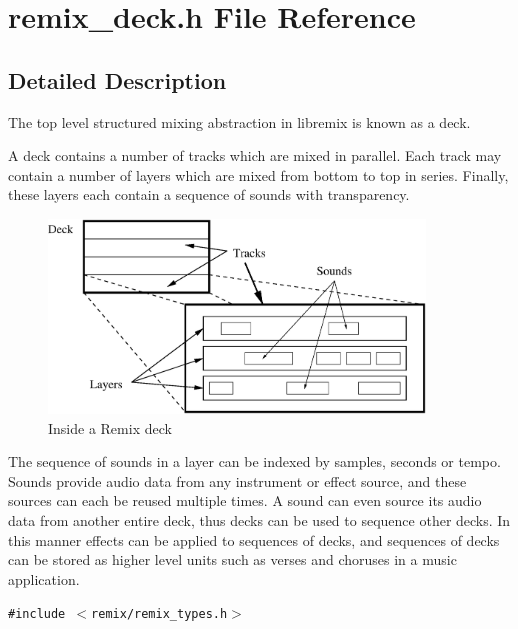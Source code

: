 \section{remix\_\-deck.h File Reference}
\label{remix__deck_8h}


\subsection{Detailed Description}
The top level structured mixing abstraction in libremix is known as a deck. 

A deck contains a number of tracks which are mixed in parallel. Each track may contain a number of layers which are mixed from bottom to top in series. Finally, these layers each contain a sequence of sounds with transparency.

\begin{figure}[H]
\begin{center}
\includegraphics[width=10cm]{decks}\caption{Inside a Remix deck}
\end{center}
\end{figure}


The sequence of sounds in a layer can be indexed by samples, seconds or tempo. Sounds provide audio data from any instrument or effect source, and these sources can each be reused multiple times. A sound can even source its audio data from another entire deck, thus decks can be used to sequence other decks. In this manner effects can be applied to sequences of decks, and sequences of decks can be stored as higher level units such as verses and choruses in a music application.

{\tt \#include $<$remix/remix\_\-types.h$>$}\par
